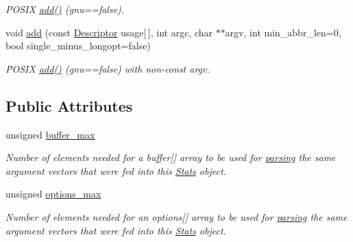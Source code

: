 \begin{DoxyCompactItemize}
\begin{DoxyCompactList}\small\item\em P\+O\+S\+IX \hyperlink{structoption_1_1Stats_aa77e2a8b1704527d2d087820f4456143}{add()} (gnu==false). \end{DoxyCompactList}\item 
void \hyperlink{structoption_1_1Stats_ad659604438f79c79f5bc009f2a16ca92}{add} (const \hyperlink{structoption_1_1Descriptor}{Descriptor} usage\mbox{[}$\,$\mbox{]}, int argc, char $\ast$$\ast$argv, int min\+\_\+abbr\+\_\+len=0, bool single\+\_\+minus\+\_\+longopt=false)\hypertarget{structoption_1_1Stats_ad659604438f79c79f5bc009f2a16ca92}{}\label{structoption_1_1Stats_ad659604438f79c79f5bc009f2a16ca92}

\begin{DoxyCompactList}\small\item\em P\+O\+S\+IX \hyperlink{structoption_1_1Stats_aa77e2a8b1704527d2d087820f4456143}{add()} (gnu==false) with non-\/const argv. \end{DoxyCompactList}\end{DoxyCompactItemize}
\subsection*{Public Attributes}
\begin{DoxyCompactItemize}
\item 
unsigned \hyperlink{structoption_1_1Stats_a2c9a7b4174f91ba8bcadaa9ad6f0db06}{buffer\+\_\+max}
\begin{DoxyCompactList}\small\item\em Number of elements needed for a {\ttfamily buffer}\mbox{[}\mbox{]} array to be used for \hyperlink{classoption_1_1Parser_a6e0b5778d1cfbd6cd51240e74d01e138}{parsing} the same argument vectors that were fed into this \hyperlink{structoption_1_1Stats}{Stats} object. \end{DoxyCompactList}\item 
unsigned \hyperlink{structoption_1_1Stats_a8121787feb1c7db84fca3ccb012b0473}{options\+\_\+max}
\begin{DoxyCompactList}\small\item\em Number of elements needed for an {\ttfamily options}\mbox{[}\mbox{]} array to be used for \hyperlink{classoption_1_1Parser_a6e0b5778d1cfbd6cd51240e74d01e138}{parsing} the same argument vectors that were fed into this \hyperlink{structoption_1_1Stats}{Stats} object. \end{DoxyCompactList}\end{DoxyCompactItemize}


